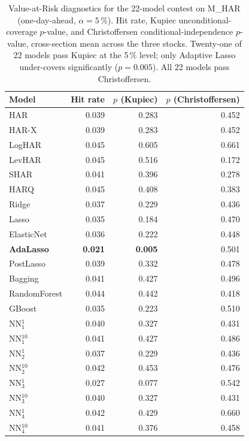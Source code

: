 \documentclass[twocolumn,9pt]{extarticle}
\begin{document}
\begin{table}[H]
\centering\small
\caption{Value-at-Risk diagnostics for the 22-model contest on
M\_HAR (one-day-ahead, $\alpha=5\,\%$). Hit rate, Kupiec
unconditional-coverage $p$-value, and Christoffersen
conditional-independence $p$-value, cross-section mean across the
three stocks. Twenty-one of 22 models pass Kupiec at the 5\,\%
level; only Adaptive Lasso under-covers significantly
($p=0.005$). All 22 models pass Christoffersen.}
\label{tab:var}
\begin{tabular}{lrrr}
\toprule
Model & Hit rate & $p$ (Kupiec) & $p$ (Christoffersen) \\
\midrule
HAR         & 0.039 & 0.283 & 0.452 \\
HAR-X       & 0.039 & 0.283 & 0.452 \\
LogHAR      & 0.045 & 0.605 & 0.661 \\
LevHAR      & 0.045 & 0.516 & 0.172 \\
SHAR        & 0.041 & 0.396 & 0.278 \\
HARQ        & 0.045 & 0.408 & 0.383 \\
Ridge       & 0.037 & 0.229 & 0.436 \\
Lasso       & 0.035 & 0.184 & 0.470 \\
ElasticNet  & 0.036 & 0.222 & 0.448 \\
\textbf{AdaLasso}   & \textbf{0.021} & \textbf{0.005} & 0.501 \\
PostLasso   & 0.039 & 0.332 & 0.478 \\
Bagging     & 0.041 & 0.427 & 0.496 \\
RandomForest& 0.044 & 0.442 & 0.418 \\
GBoost      & 0.035 & 0.223 & 0.510 \\
NN$_1^{1}$  & 0.040 & 0.327 & 0.431 \\
NN$_1^{10}$ & 0.041 & 0.427 & 0.486 \\
NN$_2^{1}$  & 0.037 & 0.229 & 0.436 \\
NN$_2^{10}$ & 0.042 & 0.453 & 0.476 \\
NN$_3^{1}$  & 0.027 & 0.077 & 0.542 \\
NN$_3^{10}$ & 0.040 & 0.327 & 0.431 \\
NN$_4^{1}$  & 0.042 & 0.429 & 0.660 \\
NN$_4^{10}$ & 0.041 & 0.376 & 0.458 \\
\bottomrule
\end{tabular}
\end{table}
\end{document}
